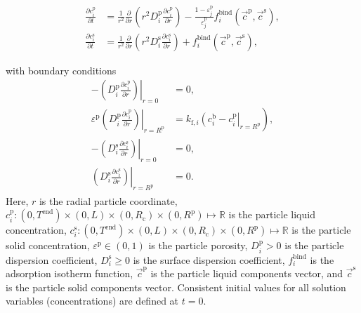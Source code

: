 \documentclass{article}
\begin{document}
\begin{align}
\frac{\partial c^{\mathrm{p}}_{i}}{\partial t} &= \frac{1}{r^2} \frac{\partial }{\partial r} \left( r^2 D_{i}^{\mathrm{p}} \frac{\partial c^{\mathrm{p}}_{i}}{\partial r} \right) - \frac{1 - \varepsilon^{\mathrm{p}}_{j}}{\varepsilon^{\mathrm{p}}_{j}}f^{\mathrm{bind}}_{i}\left( \vec{c}^{\mathrm{p}}, \vec{c}^{\mathrm{s}} \right) , \\
\frac{\partial c^{\mathrm{s}}_{i}}{\partial t} &=  \frac{1}{r^2} \frac{\partial }{\partial r} \left( r^2 D_{i}^{\mathrm{s}} \frac{\partial c^{\mathrm{s}}_{i}}{\partial r} \right)  + f^{\mathrm{bind}}_{i}\left( \vec{c}^{\mathrm{p}}, \vec{c}^{\mathrm{s}} \right) ,
\end{align}

with boundary conditions
\begin{align}
- \left. \left( D^{\mathrm{p}}_{i} \frac{\partial c^{\mathrm{p}}_{i}}{\partial r} \right) \right|_{r=0}
&= 0, \\
\varepsilon^{\mathrm{p}} \left. \left( D^{\mathrm{p}}_{i} \frac{\partial c^{\mathrm{p}}_{i}}{\partial r} \right)\right|_{r = R^{\mathrm{p}}_{}}
               &= k_{\mathrm{f},i} \left. \left( c^{\mathrm{b}}_i - c^{\mathrm{p}}_{i} \right|_{r = R^{\mathrm{p}}_{}} \right),\\
-\left( \left. D^{\mathrm{s}}_{i} \frac{\partial c^{\mathrm{s}}_{i}}{\partial r} \right) \right|_{r=0}
&= 0, \\
\left( \left. D^{\mathrm{s}}_{i} \frac{\partial c^{\mathrm{s}}_{i}}{\partial r} \right) \right|_{r = R^{\mathrm{p}}_{}}
&= 0.
\end{align}
Here, $r$ is the radial particle coordinate, $c^\mathrm{p}_i\colon  (0, T^\mathrm{end}) \times (0, L)\times (0, R_\mathrm{c})\times (0, R^{\mathrm{p}}) \mapsto \mathbb{R}$ is the particle liquid concentration, $c^\mathrm{s}_i\colon  (0, T^\mathrm{end}) \times (0, L)\times (0, R_\mathrm{c})\times (0, R^{\mathrm{p}}) \mapsto \mathbb{R}$ is the particle solid concentration, $\varepsilon^\mathrm{p}\in (0, 1)$ is the particle porosity, $D^\mathrm{p}_i> 0$ is the particle dispersion coefficient, $D^\mathrm{s}_i\geq 0$ is the surface dispersion coefficient, $f^\mathrm{bind}_i$ is the adsorption isotherm function, $\vec{c}^\mathrm{p}$ is the particle liquid components vector, and $\vec{c}^\mathrm{s}$ is the particle solid components vector.
Consistent initial values for all solution variables (concentrations) are defined at $t = 0$.
\end{document}

